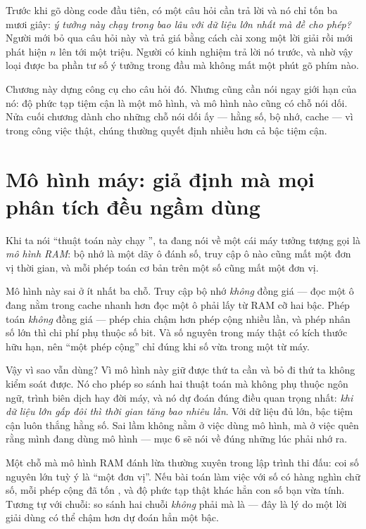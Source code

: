 \documentclass[../../algorithm.tex]{subfiles}
\begin{document}
Trước khi gõ dòng code đầu tiên, có một câu hỏi cần trả lời và nó chỉ tốn ba mươi giây: \emph{ý tưởng này chạy trong bao lâu với dữ liệu lớn nhất mà đề cho phép?} Người mới bỏ qua câu hỏi này và trả giá bằng cách cài xong một lời giải  rồi mới phát hiện \(n\) lên tới một triệu. Người có kinh nghiệm trả lời nó trước, và nhờ vậy loại được ba phần tư số ý tưởng trong đầu mà không mất một phút gõ phím nào.

Chương này dựng công cụ cho câu hỏi đó. Nhưng cũng cần nói ngay giới hạn của nó: độ phức tạp tiệm cận là một mô hình, và mô hình nào cũng có chỗ nói dối. Nửa cuối chương dành cho những chỗ nói dối ấy --- hằng số, bộ nhớ, cache --- vì trong công việc thật, chúng thường quyết định nhiều hơn cả bậc tiệm cận.

\section{Mô hình máy: giả định mà mọi phân tích đều ngầm dùng}

Khi ta nói ``thuật toán này chạy '', ta đang nói về một cái máy tưởng tượng gọi là \emph{mô hình RAM}: bộ nhớ là một dãy ô đánh số, truy cập ô nào cũng mất một đơn vị thời gian, và mỗi phép toán cơ bản trên một số cũng mất một đơn vị.

Mô hình này sai ở ít nhất ba chỗ. Truy cập bộ nhớ \emph{không} đồng giá --- đọc một ô đang nằm trong cache nhanh hơn đọc một ô phải lấy từ RAM cỡ hai bậc. Phép toán \emph{không} đồng giá --- phép chia chậm hơn phép cộng nhiều lần, và phép nhân số lớn thì chi phí phụ thuộc số bit. Và số nguyên trong máy thật có kích thước hữu hạn, nên ``một phép cộng'' chỉ đúng khi số vừa trong một từ máy.

Vậy vì sao vẫn dùng? Vì mô hình này giữ được thứ ta cần và bỏ đi thứ ta không kiểm soát được. Nó cho phép so sánh hai thuật toán mà không phụ thuộc ngôn ngữ, trình biên dịch hay đời máy, và nó dự đoán đúng điều quan trọng nhất: \emph{khi dữ liệu lớn gấp đôi thì thời gian tăng bao nhiêu lần}. Với dữ liệu đủ lớn, bậc tiệm cận luôn thắng hằng số. Sai lầm không nằm ở việc dùng mô hình, mà ở việc quên rằng mình đang dùng mô hình --- mục 6 sẽ nói về đúng những lúc phải nhớ ra.

\begin{cambay}
Một chỗ mà mô hình RAM đánh lừa thường xuyên trong lập trình thi đấu: coi số nguyên lớn tuỳ ý là ``một đơn vị''. Nếu bài toán làm việc với số có hàng nghìn chữ số, mỗi phép cộng đã tốn , và độ phức tạp thật khác hẳn con số bạn vừa tính. Tương tự với chuỗi: so sánh hai chuỗi \emph{không} phải  mà là  --- đây là lý do một lời giải dùng  có thể chậm hơn dự đoán hẳn một bậc.
\end{cambay}
\end{document}
